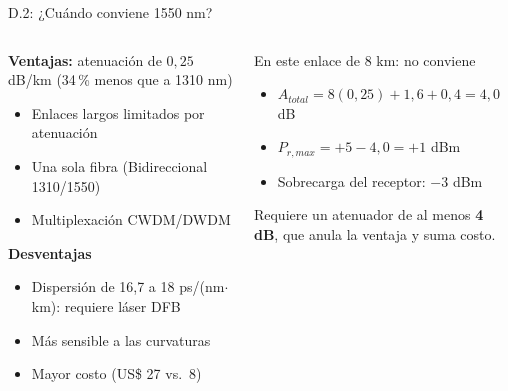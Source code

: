 \begin{frame}{D.2: ¿Cuándo conviene 1550 nm?}
  \begin{columns}[T]
    \begin{column}{0.5\textwidth}
      \textbf{Ventajas:} atenuación de $0{,}25$ dB/km (34\,\% menos que a 1310 nm)
      \begin{itemize}
        \item Enlaces largos limitados por atenuación
        \item Una sola fibra (Bidireccional 1310/1550)
        \item Multiplexación CWDM/DWDM
      \end{itemize}
      \textbf{Desventajas}
      \begin{itemize}
        \item Dispersión de 16,7 a 18 ps/(nm$\cdot$km): requiere láser DFB
        \item Más sensible a las curvaturas
        \item Mayor costo (US\$ 27 vs.\ 8)
      \end{itemize}
    \end{column}
    \begin{column}{0.5\textwidth}
      \begin{block}{En este enlace de 8 km: no conviene}
        \begin{itemize}
          \item $A_{total} = 8(0{,}25) + 1{,}6 + 0{,}4 = 4{,}0$ dB
          \item $P_{r,max} = +5 - 4{,}0 = +1$ dBm
          \item Sobrecarga del receptor: $-3$ dBm
        \end{itemize}
        Requiere un atenuador de al menos \textbf{4 dB}, que anula la ventaja y suma costo.
      \end{block}
    \end{column}
  \end{columns}
\end{frame}

